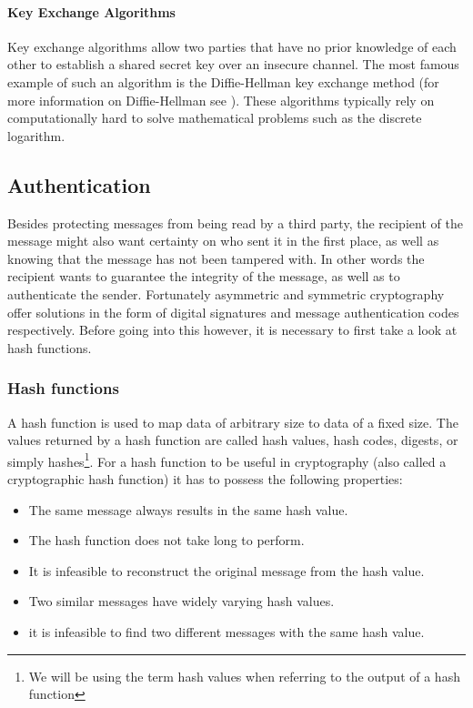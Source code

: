\documentclass[master=cws,masteroption=vs,english]{kulemt}
\begin{document}
\paragraph{Key Exchange Algorithms} Key exchange algorithms allow two parties that have no prior knowledge of each other to establish a shared secret key over an insecure channel. The most famous example of such an algorithm is the Diffie-Hellman key exchange method (for more information on Diffie-Hellman see \cite{wiki:DH}). These algorithms typically rely on computationally hard to solve mathematical problems such as the discrete logarithm.

\subsection{Authentication} Besides protecting messages from being read by a third party, the recipient of the message might also want certainty on who sent it in the first place, as well as knowing that the message has not been tampered with. In other words the recipient wants to guarantee the integrity of the message, as well as to authenticate the sender. Fortunately asymmetric and symmetric cryptography offer solutions in the form of digital signatures and message authentication codes respectively. Before going into this however, it is necessary to first take a look at hash functions.

\subsubsection{Hash functions} A hash function is used to map data of arbitrary size to data of a fixed size. The values returned by a hash function are called hash values, hash codes, digests, or simply hashes\footnote{We will be using the term hash values when referring to the output of a hash function}. For a hash function to be useful in cryptography (also called a cryptographic hash function) it has to possess the following properties\cite{wiki:Hash}:

\begin{itemize}
	\item The same message always results in the same hash value.
	\item The hash function does not take long to perform.
	\item It is infeasible to reconstruct the original message from the hash value.
	\item Two similar messages have widely varying hash values.
	\item it is infeasible to find two different messages with the same hash value.
\end{itemize}
\end{document}
